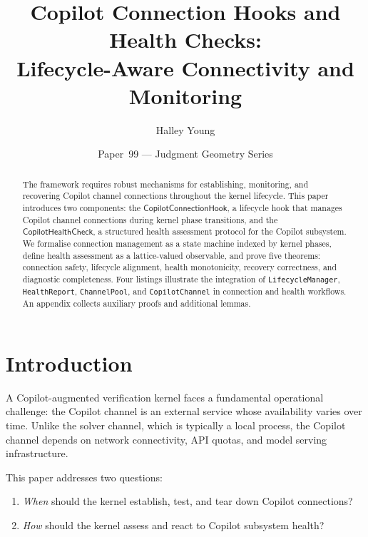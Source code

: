 \documentclass[11pt]{article}
\title{\textbf{Copilot Connection Hooks and Health Checks:\\
Lifecycle-Aware Connectivity and Monitoring}}
\author{Halley Young}
\date{Paper~99 --- Judgment Geometry Series}
\newcommand{\ConnHook}{\mathsf{CopilotConnectionHook}}
\newcommand{\HealthChk}{\mathsf{CopilotHealthCheck}}
\begin{document}
\maketitle

\begin{abstract}
The \JuGeo{} framework requires robust mechanisms for
establishing, monitoring, and recovering Copilot channel
connections throughout the kernel lifecycle.  This paper
introduces two components: the $\ConnHook$, a lifecycle hook
that manages Copilot channel connections during kernel phase
transitions, and the $\HealthChk$, a structured health
assessment protocol for the Copilot subsystem.  We formalise
connection management as a state machine indexed by kernel
phases, define health assessment as a lattice-valued observable,
and prove five theorems: connection safety, lifecycle alignment,
health monotonicity, recovery correctness, and diagnostic
completeness.  Four \Python{} listings illustrate the
integration of \texttt{LifecycleManager}, \texttt{HealthReport},
\texttt{ChannelPool}, and \texttt{CopilotChannel} in
connection and health workflows.  An appendix collects
auxiliary proofs and additional lemmas.
\end{abstract}

\section{Introduction}\label{sec:intro}

A Copilot-augmented verification kernel faces a fundamental
operational challenge: the Copilot channel is an external
service whose availability varies over time.  Unlike the
solver channel, which is typically a local process, the
Copilot channel depends on network connectivity, API
quotas, and model serving infrastructure.

This paper addresses two questions:
\begin{enumerate}
\item \emph{When} should the kernel establish, test, and tear
      down Copilot connections?
\item \emph{How} should the kernel assess and react to
      Copilot subsystem health?
\end{enumerate}
\end{document}
